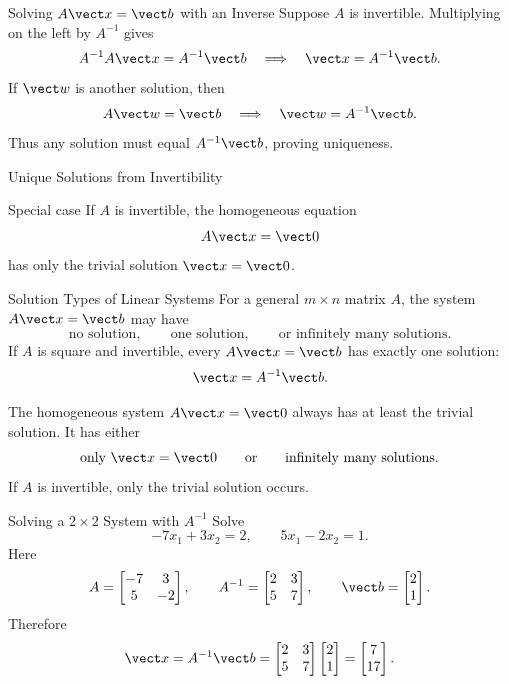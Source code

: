 \begin{frame}{Solving $A\vect x=\vect b$ with an Inverse}
Suppose $A$ is invertible. Multiplying on the left by $A^{-1}$ gives
\[
A^{-1}A\vect x=A^{-1}\vect b
\quad\Longrightarrow\quad
\vect x=A^{-1}\vect b.
\]
If $\vect w$ is another solution, then
\[
A\vect w=\vect b
\quad\Longrightarrow\quad
\vect w=A^{-1}\vect b.
\]
Thus any solution must equal $A^{-1}\vect b$, proving uniqueness.
\end{frame}

\begin{frame}{Unique Solutions from Invertibility}
\medskip
\begin{block}{Special case}
If $A$ is invertible, the homogeneous equation
\[
A\vect x=\vect0
\]
has only the trivial solution $\vect x=\vect0$.
\end{block}
\end{frame}

\begin{frame}[shrink=7]{Solution Types of Linear Systems}
For a general $m\times n$ matrix $A$, the system $A\vect x=\vect b$ may have
\[
\text{no solution},\qquad \text{one solution},\qquad\text{or infinitely many solutions}.
\]
If $A$ is square and invertible, every $A\vect x=\vect b$ has exactly one solution:
\[
\vect x=A^{-1}\vect b.
\]
\medskip

The homogeneous system $A\vect x=\vect0$ always has at least the trivial solution. It has either
\[
\text{only }\vect x=\vect0
\qquad\text{or}\qquad
\text{infinitely many solutions}.
\]
If $A$ is invertible, only the trivial solution occurs.
\end{frame}

\begin{frame}{Solving a $2\times2$ System with $A^{-1}$}
Solve
\[
-7x_1+3x_2=2,\qquad 5x_1-2x_2=1.
\]
Here
\[
A=\begin{bmatrix}-7&3\\5&-2\end{bmatrix},
\qquad
A^{-1}=\begin{bmatrix}2&3\\5&7\end{bmatrix},
\qquad
\vect b=\begin{bmatrix}2\\1\end{bmatrix}.
\]
Therefore
\[
\vect x=A^{-1}\vect b
=\begin{bmatrix}2&3\\5&7\end{bmatrix}
\begin{bmatrix}2\\1\end{bmatrix}
=\begin{bmatrix}7\\17\end{bmatrix}.
\]
\end{frame}

